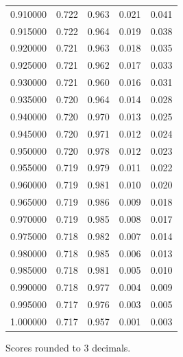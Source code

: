 \begin{table}[htbp]
\begin{tabular}{lllll}
0.910000 & 0.722 & 0.963 & 0.021 & 0.041 \\
0.915000 & 0.722 & 0.964 & 0.019 & 0.038 \\
0.920000 & 0.721 & 0.963 & 0.018 & 0.035 \\
0.925000 & 0.721 & 0.962 & 0.017 & 0.033 \\
0.930000 & 0.721 & 0.960 & 0.016 & 0.031 \\
0.935000 & 0.720 & 0.964 & 0.014 & 0.028 \\
0.940000 & 0.720 & 0.970 & 0.013 & 0.025 \\
0.945000 & 0.720 & 0.971 & 0.012 & 0.024 \\
0.950000 & 0.720 & 0.978 & 0.012 & 0.023 \\
0.955000 & 0.719 & 0.979 & 0.011 & 0.022 \\
0.960000 & 0.719 & 0.981 & 0.010 & 0.020 \\
0.965000 & 0.719 & 0.986 & 0.009 & 0.018 \\
0.970000 & 0.719 & 0.985 & 0.008 & 0.017 \\
0.975000 & 0.718 & 0.982 & 0.007 & 0.014 \\
0.980000 & 0.718 & 0.985 & 0.006 & 0.013 \\
0.985000 & 0.718 & 0.981 & 0.005 & 0.010 \\
0.990000 & 0.718 & 0.977 & 0.004 & 0.009 \\
0.995000 & 0.717 & 0.976 & 0.003 & 0.005 \\
1.000000 & 0.717 & 0.957 & 0.001 & 0.003 \\
\bottomrule
\end{tabular}

\begin{tablenotes}[flushleft]
\item \small{Scores rounded to 3 decimals.}
\end{tablenotes}
\end{table}